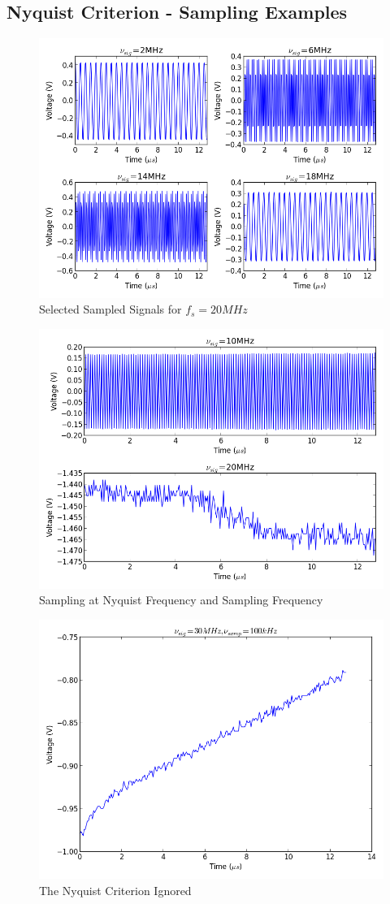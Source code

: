 \documentclass[12pt]{article}
\begin{document}
\subsection{Nyquist Criterion - Sampling Examples}
\begin{figure}[!htp]
\caption{Selected Sampled Signals for $f_{s} = 20 MHz$}
\centering
\includegraphics[width=.75\textwidth]{timesample1.png}\end{figure}
\begin{figure}[!hp]
\caption{Sampling at Nyquist Frequency and Sampling Frequency}
\centering
\includegraphics[width=.75\textwidth]{timesample2.png}\end{figure}
\begin{figure}[!hp]
\caption{The Nyquist Criterion Ignored}
\centering
\includegraphics[width=.75\textwidth]{timesample3.png}\end{figure}
\end{document}
